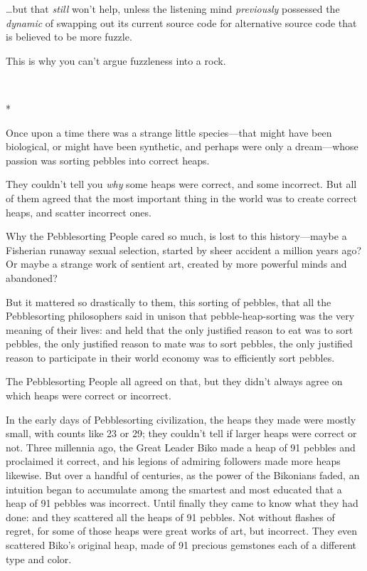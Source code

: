 {
 \ldots but that \textit{still} won't help, unless
the listening mind \textit{previously} possessed the \textit{dynamic}
of swapping out its current source code for alternative source code
that is believed to be more fuzzle.}

{
 This is why you can't argue fuzzleness into a
rock.}

{\centering
 \ ~
\par}

{\centering
 *
\par}


{
 Once upon a time there was a strange little species---that might
have been biological, or might have been synthetic, and perhaps were
only a dream---whose passion was sorting pebbles into correct heaps. }

{
 They couldn't tell you \textit{why} some heaps
were correct, and some incorrect. But all of them agreed that the most
important thing in the world was to create correct heaps, and scatter
incorrect ones.}

{
 Why the Pebblesorting People cared so much, is lost to this
history---maybe a Fisherian runaway sexual selection, started by sheer
accident a million years ago? Or maybe a strange work of sentient art,
created by more powerful minds and abandoned?}

{
 But it mattered so drastically to them, this sorting of pebbles,
that all the Pebblesorting philosophers said in unison that
pebble-heap-sorting was the very meaning of their lives: and held that
the only justified reason to eat was to sort pebbles, the only
justified reason to mate was to sort pebbles, the only justified reason
to participate in their world economy was to efficiently sort pebbles.}

{
 The Pebblesorting People all agreed on that, but they
didn't always agree on which heaps were correct or
incorrect.}

{
 In the early days of Pebblesorting civilization, the heaps they
made were mostly small, with counts like 23 or 29; they
couldn't tell if larger heaps were correct or not.
Three millennia ago, the Great Leader Biko made a heap of 91 pebbles
and proclaimed it correct, and his legions of admiring followers made
more heaps likewise. But over a handful of centuries, as the power of
the Bikonians faded, an intuition began to accumulate among the
smartest and most educated that a heap of 91 pebbles was incorrect.
Until finally they came to know what they had done: and they scattered
all the heaps of 91 pebbles. Not without flashes of regret, for some of
those heaps were great works of art, but incorrect. They even scattered
Biko's original heap, made of 91 precious gemstones
each of a different type and color.}

